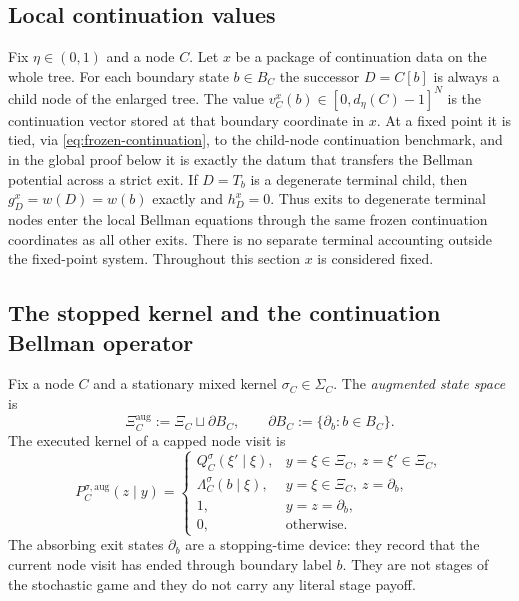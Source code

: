 \documentclass[12pt]{article}
\theoremstyle{definition}
\newcommand{\1}{\mathbf{1}}
\begin{document}
\subsection{Local continuation values}

Fix $\eta\in(0,1)$ and a node $C$. Let $x$ be a package of continuation data on the
whole tree. For each boundary state $b\in B_C$ the successor $D=C[b]$ is always a
child node of the enlarged tree. The value
$v_C^x(b)\in[0,d_\eta(C)-1]^N$ is the continuation vector stored at that boundary
coordinate in $x$. At a fixed point it is tied, via
\eqref{eq:frozen-continuation}, to the child-node continuation benchmark, and in
the global proof below it is exactly the datum that transfers the Bellman
potential across a strict exit. If $D=T_b$ is a degenerate terminal child, then
$g_D^x=w(D)=w(b)$ exactly and $h_D^x=0$. Thus exits to degenerate terminal nodes
enter the local Bellman equations through the same frozen continuation
coordinates as all other exits. There is no separate terminal accounting outside
the fixed-point system. Throughout this section $x$ is considered fixed.


\subsection{The stopped kernel and the continuation Bellman operator}

Fix a node $C$ and a stationary mixed kernel $\sigma_C\in\Sigma_C$. The
\emph{augmented state space} is
\[
\Xi_C^{\mathrm{aug}}:=\Xi_C\sqcup \partial B_C,
\qquad
\partial B_C:=\{\partial_b:b\in B_C\}.
\]
The executed kernel of a capped node visit is
\begin{equation}
\label{eq:aug-kernel}
P_C^{\sigma,\mathrm{aug}}(z\mid y)
=
\begin{cases}
Q_C^{\sigma}(\xi'\mid \xi), & y=\xi\in\Xi_C,\ z=\xi'\in\Xi_C,\\[0.3em]
\Lambda_C^{\sigma}(b\mid \xi), & y=\xi\in\Xi_C,\ z=\partial_b,\\[0.3em]
1, & y=z=\partial_b,\\[0.3em]
0, & \text{otherwise.}
\end{cases}
\end{equation}
The absorbing exit states $\partial_b$ are a stopping-time device: they record
that the current node visit has ended through boundary label $b$. They are not
stages of the stochastic game and they do not carry any literal stage payoff.
\end{document}
